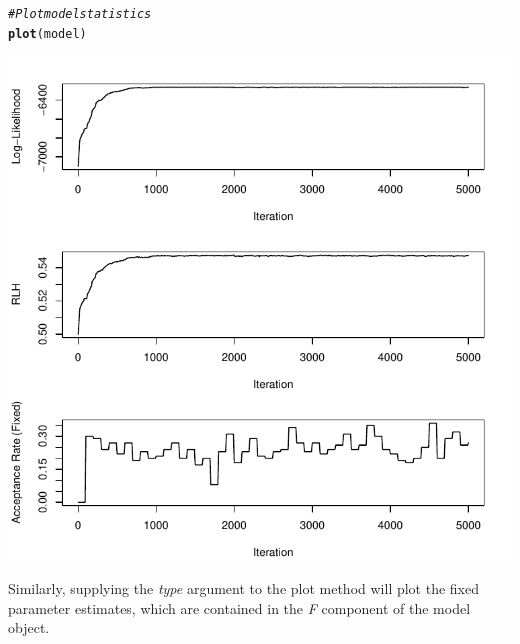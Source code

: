 \documentclass{article}\usepackage[]{graphicx}\usepackage[]{color}
\makeatletter
\def\maxwidth{ %
  \ifdim\Gin@nat@width>\linewidth
    \linewidth
  \else
    \Gin@nat@width
  \fi
}
\newcommand{\hlcom}[1]{\textcolor[rgb]{0.678,0.584,0.686}{\textit{#1}}}%
\newcommand{\hlstd}[1]{\textcolor[rgb]{0.345,0.345,0.345}{#1}}%
\newcommand{\hlkwd}[1]{\textcolor[rgb]{0.737,0.353,0.396}{\textbf{#1}}}%
\newenvironment{kframe}{%
 \def\at@end@of@kframe{}%
 \ifinner\ifhmode%
  \def\at@end@of@kframe{\end{minipage}}%
  \begin{minipage}{\columnwidth}%
 \fi\fi%
 \def\FrameCommand##1{\hskip\@totalleftmargin \hskip-\fboxsep
 \colorbox{shadecolor}{##1}\hskip-\fboxsep
     \hskip-\linewidth \hskip-\@totalleftmargin \hskip\columnwidth}%
 \MakeFramed {\advance\hsize-\width
   \@totalleftmargin\z@ \linewidth\hsize
   \@setminipage}}%
 {\par\unskip\endMakeFramed%
 \at@end@of@kframe}
\newenvironment{knitrout}{}{} %
\makeatother
\begin{document}
\begin{knitrout}
\color{fgcolor}\begin{kframe}
\begin{alltt}
\hlcom{# Plot model statistics}
\hlkwd{plot}\hlstd{(model)}
\end{alltt}
\end{kframe}
\includegraphics[width=\maxwidth]{figure/unnamed-chunk-6-1} 

\end{knitrout}

Similarly, supplying the \emph{type} argument to the plot method will plot the fixed parameter estimates, which are contained in the \emph{F} component of the model object.
\end{document}

